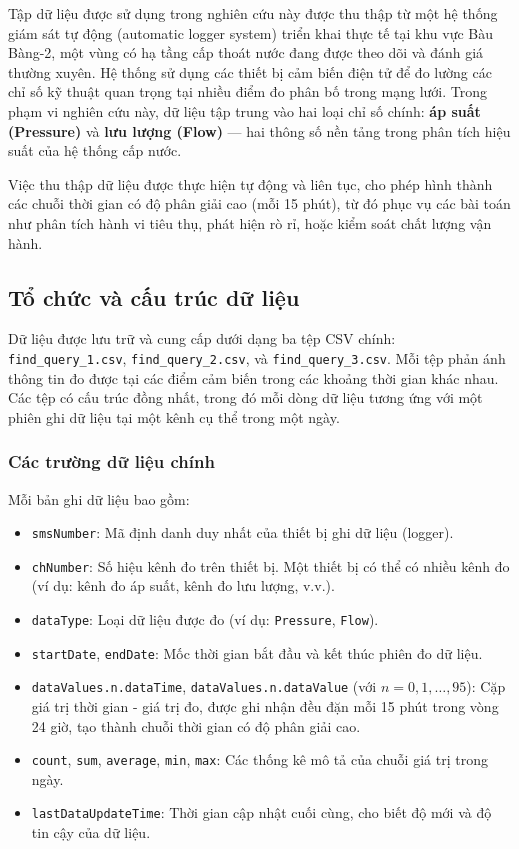 Tập dữ liệu được sử dụng trong nghiên cứu này được thu thập từ một hệ thống giám sát tự động (automatic logger system) triển khai thực tế tại khu vực Bàu Bàng-2, một vùng có hạ tầng cấp thoát nước đang được theo dõi và đánh giá thường xuyên. Hệ thống sử dụng các thiết bị cảm biến điện tử để đo lường các chỉ số kỹ thuật quan trọng tại nhiều điểm đo phân bố trong mạng lưới. Trong phạm vi nghiên cứu này, dữ liệu tập trung vào hai loại chỉ số chính: \textbf{áp suất (Pressure)} và \textbf{lưu lượng (Flow)} — hai thông số nền tảng trong phân tích hiệu suất của hệ thống cấp nước.

Việc thu thập dữ liệu được thực hiện tự động và liên tục, cho phép hình thành các chuỗi thời gian có độ phân giải cao (mỗi 15 phút), từ đó phục vụ các bài toán như phân tích hành vi tiêu thụ, phát hiện rò rỉ, hoặc kiểm soát chất lượng vận hành.

\subsection{Tổ chức và cấu trúc dữ liệu}

Dữ liệu được lưu trữ và cung cấp dưới dạng ba tệp CSV chính: \texttt{find\_query\_1.csv}, \texttt{find\_query\_2.csv}, và \texttt{find\_query\_3.csv}. Mỗi tệp phản ánh thông tin đo được tại các điểm cảm biến trong các khoảng thời gian khác nhau. Các tệp có cấu trúc đồng nhất, trong đó mỗi dòng dữ liệu tương ứng với một phiên ghi dữ liệu tại một kênh cụ thể trong một ngày.

\subsubsection{Các trường dữ liệu chính}

Mỗi bản ghi dữ liệu bao gồm:

\begin{itemize}
    \item \texttt{smsNumber}: Mã định danh duy nhất của thiết bị ghi dữ liệu (logger).
    \item \texttt{chNumber}: Số hiệu kênh đo trên thiết bị. Một thiết bị có thể có nhiều kênh đo (ví dụ: kênh đo áp suất, kênh đo lưu lượng, v.v.).
    \item \texttt{dataType}: Loại dữ liệu được đo (ví dụ: \texttt{Pressure}, \texttt{Flow}).
    \item \texttt{startDate}, \texttt{endDate}: Mốc thời gian bắt đầu và kết thúc phiên đo dữ liệu.
    \item \texttt{dataValues.n.dataTime}, \texttt{dataValues.n.dataValue} (với $n = 0,1,\ldots,95$): Cặp giá trị thời gian - giá trị đo, được ghi nhận đều đặn mỗi 15 phút trong vòng 24 giờ, tạo thành chuỗi thời gian có độ phân giải cao.
    \item \texttt{count}, \texttt{sum}, \texttt{average}, \texttt{min}, \texttt{max}: Các thống kê mô tả của chuỗi giá trị trong ngày.
    \item \texttt{lastDataUpdateTime}: Thời gian cập nhật cuối cùng, cho biết độ mới và độ tin cậy của dữ liệu.
\end{itemize}

